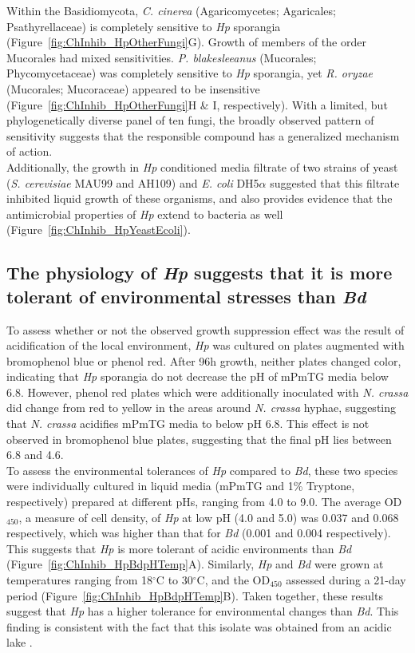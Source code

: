 \indent Within the Basidiomycota, \textit{C. cinerea} (Agaricomycetes; Agaricales; Psathyrellaceae) is completely sensitive to \textit{Hp} sporangia (Figure~\ref{fig:ChInhib_HpOtherFungi}G). Growth of members of the order Mucorales had mixed sensitivities. \textit{P. blakesleeanus} (Mucorales; Phycomycetaceae) was completely sensitive to \textit{Hp} sporangia, yet \textit{R. oryzae} (Mucorales; Mucoraceae) appeared to be insensitive (Figure~\ref{fig:ChInhib_HpOtherFungi}H \& I, respectively). With a limited, but phylogenetically diverse panel of ten fungi, the broadly observed pattern of sensitivity suggests that the responsible compound has a generalized mechanism of action.\\
\indent Additionally, the growth in \textit{Hp} conditioned media filtrate of two strains of yeast (\textit{S. cerevisiae} MAU99 and AH109) and \textit{E. coli} DH5$\alpha$ suggested that this filtrate inhibited liquid growth of these organisms, and also provides evidence that the antimicrobial properties of \textit{Hp} extend to bacteria as well (Figure~\ref{fig:ChInhib_HpYeastEcoli}).\\

\subsection*{The physiology of \textit{Hp} suggests that it is more tolerant of environmental stresses than \textit{Bd}}
To assess whether or not the observed growth suppression effect was the result of acidification of the local environment, \textit{Hp} was cultured on plates augmented with bromophenol blue or phenol red. After 96h growth, neither plates changed color, indicating that \textit{Hp} sporangia do not decrease the pH of mPmTG media below 6.8. However, phenol red plates which were additionally inoculated with \textit{N. crassa} did change from red to yellow in the areas around \textit{N. crassa} hyphae, suggesting that \textit{N. crassa} acidifies mPmTG media to below pH 6.8. This effect is not observed in bromophenol blue plates, suggesting that the final pH lies between 6.8 and 4.6.\\
\indent To assess the environmental tolerances of \textit{Hp} compared to \textit{Bd}, these two species were individually cultured in liquid media (mPmTG and 1\% Tryptone, respectively) prepared at different pHs, ranging from 4.0 to 9.0. The average OD$_{450}$, a measure of cell density, of \textit{Hp} at low pH (4.0 and 5.0) was 0.037 and 0.068 respectively, which was higher than that for \textit{Bd} (0.001 and 0.004 respectively). This suggests that \textit{Hp} is more tolerant of acidic environments than \textit{Bd} (Figure~\ref{fig:ChInhib_HpBdpHTemp}A). Similarly, \textit{Hp} and \textit{Bd} were grown at temperatures ranging from 18$^{\circ}$C to 30$^{\circ}$C, and the OD$_{450}$ assessed during a 21-day period (Figure~\ref{fig:ChInhib_HpBdpHTemp}B). Taken together, these results suggest that \textit{Hp} has a higher tolerance for environmental changes than \textit{Bd}. This finding is consistent with the fact that this isolate was obtained from an acidic lake \cite{Longcore2011}.\\

